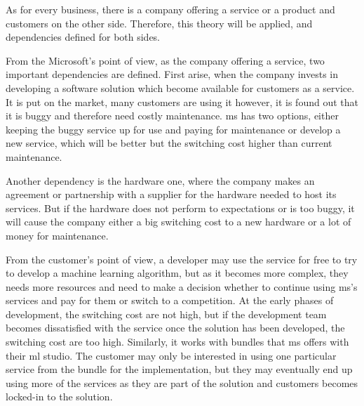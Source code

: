As for every business, there is a company offering a service or a product and customers on the other side. Therefore, this theory will be applied, and dependencies defined for both sides.

From the Microsoft’s point of view, as the company offering a service, two important dependencies are defined. First arise, when the company invests in developing a software solution which become available for customers as a service. It is put on the market, many customers are using it however, it is found out that it is buggy and therefore need costly maintenance. \acrshort{ms} has two options, either keeping the buggy service up for use and paying for maintenance or develop a new service, which will be better but the switching cost higher than current maintenance. 

Another dependency is the hardware one, where the company makes an agreement or partnership with a supplier for the hardware needed to host its services. But if the hardware does not perform to expectations or is too buggy, it will cause the company either a big switching cost to a new hardware or a lot of money for maintenance. 

From the customer’s point of view, a developer may use the service for free to try to develop a machine learning algorithm, but as it becomes more complex, they needs more resources and need to make a decision whether to continue using \acrshort{ms}’s services and pay for them or switch to a competition. At the early phases of development, the switching cost are not high, but if the development team becomes dissatisfied with the service once the solution has been developed, the switching cost are too high. Similarly, it works with bundles that \acrshort{ms} offers with their \acrshort{ml} studio. The customer may only be interested in using one particular service from the bundle for the implementation, but they may eventually end up using more of the services as they are part of the solution and customers becomes locked-in to the solution. 